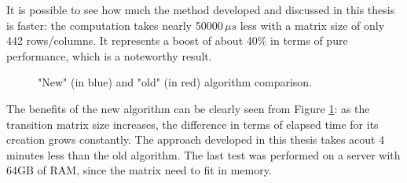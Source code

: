 It is possible to see how much the method developed and discussed in this thesis is faster: the computation takes nearly 50000\(\,\mu{s} \) less with a matrix size of only 442 rows/columns. It represents a boost of about 40\% in terms of pure performance, which is a noteworthy result.\\

\begin{figure}[H]
  \caption[]{"New" (in blue) and "old" (in red) algorithm comparison\footnotemark[3].}
  \label{performancechart}
\end{figure}


The benefits of the new algorithm can be clearly seen from Figure \ref{performancechart}: as the transition matrix size increases, the difference in terms of elapsed time for its creation grows constantly. The approach developed in this thesis takes acout 4 minutes less than the old algorithm. The last test was performed on a server with 64GB of RAM, since the matrix need to fit in memory. 